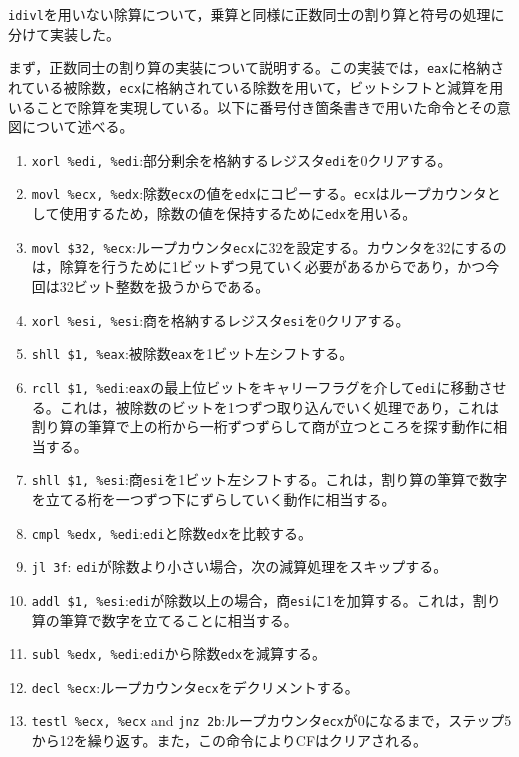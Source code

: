 \documentclass[a4paper]{jsarticle}
\newcommand{\var}[1]{\texttt{#1}}
\begin{document}
\var{idivl}を用いない除算について，乗算と同様に正数同士の割り算と符号の処理に分けて実装した。

まず，正数同士の割り算の実装について説明する。この実装では，\var{eax}に格納されている被除数，\var{ecx}に格納されている除数を用いて，ビットシフトと減算を用いることで除算を実現している。以下に番号付き箇条書きで用いた命令とその意図について述べる。

\begin{enumerate}
\item \var{xorl \%edi, \%edi}:部分剰余を格納するレジスタ\var{edi}を0クリアする。
\item \var{movl \%ecx, \%edx}:除数\var{ecx}の値を\var{edx}にコピーする。\var{ecx}はループカウンタとして使用するため，除数の値を保持するために\var{edx}を用いる。
\item \var{movl \$32, \%ecx}:ループカウンタ\var{ecx}に32を設定する。カウンタを32にするのは，除算を行うために1ビットずつ見ていく必要があるからであり，かつ今回は32ビット整数を扱うからである。
\item \var{xorl \%esi, \%esi}:商を格納するレジスタ\var{esi}を0クリアする。
\item \var{shll \$1, \%eax}:被除数\var{eax}を1ビット左シフトする。
\item \var{rcll \$1, \%edi}:\var{eax}の最上位ビットをキャリーフラグを介して\var{edi}に移動させる。これは，被除数のビットを1つずつ取り込んでいく処理であり，これは割り算の筆算で上の桁から一桁ずつずらして商が立つところを探す動作に相当する。
\item \var{shll \$1, \%esi}:商\var{esi}を1ビット左シフトする。これは，割り算の筆算で数字を立てる桁を一つずつ下にずらしていく動作に相当する。
\item \var{cmpl \%edx, \%edi}:\var{edi}と除数\var{edx}を比較する。
\item \var{jl 3f}:
\var{edi}が除数より小さい場合，次の減算処理をスキップする。
\item \var{addl \$1, \%esi}:\var{edi}が除数以上の場合，商\var{esi}に1を加算する。これは，割り算の筆算で数字を立てることに相当する。
\item \var{subl \%edx, \%edi}:\var{edi}から除数\var{edx}を減算する。
\item \var{decl \%ecx}:ループカウンタ\var{ecx}をデクリメントする。
\item \var{testl \%ecx, \%ecx} and \var{jnz 2b}:ループカウンタ\var{ecx}が0になるまで，ステップ5から12を繰り返す。また，この命令によりCFはクリアされる。
\end{enumerate}
\end{document}
